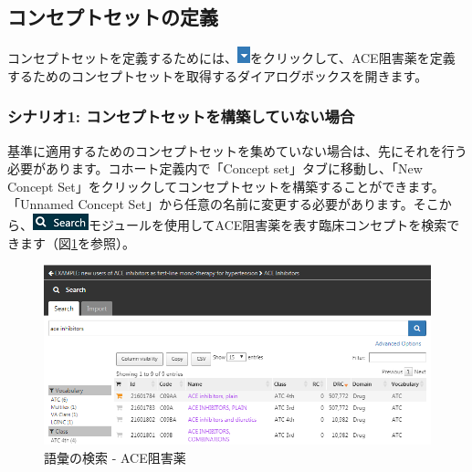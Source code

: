 \documentclass[
  11pt]{book}
\theoremstyle{definition}
\theoremstyle{definition}
\theoremstyle{definition}
\theoremstyle{definition}
\theoremstyle{remark}
\begin{document}
\subsection{コンセプトセットの定義}\label{ux30b3ux30f3ux30bbux30d7ux30c8ux30bbux30c3ux30c8ux306eux5b9aux7fa9}

コンセプトセットを定義するためには、\includegraphics{images/Cohorts/downarrow.png}をクリックして、ACE阻害薬を定義するためのコンセプトセットを取得するダイアログボックスを開きます。

\subsubsection*{シナリオ1: コンセプトセットを構築していない場合}\label{ux30b7ux30caux30eaux30aa1-ux30b3ux30f3ux30bbux30d7ux30c8ux30bbux30c3ux30c8ux3092ux69cbux7bc9ux3057ux3066ux3044ux306aux3044ux5834ux5408}

基準に適用するためのコンセプトセットを集めていない場合は、先にそれを行う必要があります。コホート定義内で「Concept set」タブに移動し、「New Concept Set」をクリックしてコンセプトセットを構築することができます。「Unnamed Concept Set」から任意の名前に変更する必要があります。そこから、\includegraphics{images/Cohorts/search-2.png}モジュールを使用してACE阻害薬を表す臨床コンセプトを検索できます（図\ref{fig:aceinhibitors}を参照）。

\begin{figure}

{\centering \includegraphics[width=1\linewidth]{images/Cohorts/aceinhibitors} 

}

\caption{語彙の検索 - ACE阻害薬}\label{fig:aceinhibitors}
\end{figure}
\end{document}
